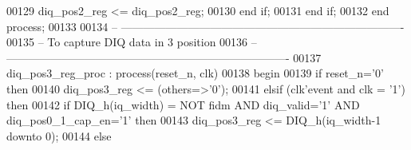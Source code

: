 \begin{DoxyCode}
00129                 \textcolor{vhdlchar}{diq_pos2_reg} \textcolor{vhdlchar}{<=} \textcolor{vhdlchar}{diq_pos2_reg};
00130             \textcolor{keywordflow}{end} \textcolor{keywordflow}{if}; 
00131         \textcolor{keywordflow}{end} \textcolor{keywordflow}{if};
00132     \textcolor{keywordflow}{end} \textcolor{keywordflow}{process};
00133 
00134 \textcolor{keyword}{-- ----------------------------------------------------------------------------}
00135 \textcolor{keyword}{-- To capture DIQ data in 3 position}
00136 \textcolor{keyword}{-- ----------------------------------------------------------------------------}
00137 diq\_pos3\_reg\_proc : \textcolor{keywordflow}{process}(reset_n, clk)
00138 \textcolor{vhdlkeyword}{    begin}
00139       \textcolor{keywordflow}{if} \textcolor{vhdlchar}{reset_n}\textcolor{vhdlchar}{=}\textcolor{vhdlchar}{'}\textcolor{vhdllogic}{}\textcolor{vhdllogic}{0}\textcolor{vhdlchar}{'} \textcolor{keywordflow}{then}
00140          \textcolor{vhdlchar}{diq_pos3_reg} \textcolor{vhdlchar}{<=} \textcolor{vhdlchar}{(}\textcolor{keywordflow}{others}\textcolor{vhdlchar}{=}\textcolor{vhdlchar}{>}\textcolor{vhdlchar}{'}\textcolor{vhdllogic}{}\textcolor{vhdllogic}{0}\textcolor{vhdlchar}{'}\textcolor{vhdlchar}{)}; 
00141       \textcolor{keywordflow}{elsif} \textcolor{vhdlchar}{(}\textcolor{vhdlchar}{clk}\textcolor{vhdlchar}{'}\textcolor{vhdlkeyword}{event} \textcolor{keywordflow}{and} \textcolor{vhdlchar}{clk} \textcolor{vhdlchar}{=} \textcolor{vhdlchar}{'}\textcolor{vhdllogic}{}\textcolor{vhdllogic}{1}\textcolor{vhdlchar}{'}\textcolor{vhdlchar}{)} \textcolor{keywordflow}{then}
00142             \textcolor{keywordflow}{if} \textcolor{vhdlchar}{DIQ_h}\textcolor{vhdlchar}{(}\textcolor{vhdlchar}{iq_width}\textcolor{vhdlchar}{)} \textcolor{vhdlchar}{=} \textcolor{keywordflow}{NOT} \textcolor{vhdlchar}{fidm} \textcolor{keywordflow}{AND} \textcolor{vhdlchar}{diq_valid}\textcolor{vhdlchar}{=}\textcolor{vhdlchar}{'}\textcolor{vhdllogic}{}\textcolor{vhdllogic}{1}\textcolor{vhdlchar}{'} \textcolor{keywordflow}{AND} \textcolor{vhdlchar}{
      diq_pos0_1_cap_en}\textcolor{vhdlchar}{=}\textcolor{vhdlchar}{'}\textcolor{vhdllogic}{}\textcolor{vhdllogic}{1}\textcolor{vhdlchar}{'} \textcolor{keywordflow}{then} 
00143             \textcolor{vhdlchar}{diq_pos3_reg} \textcolor{vhdlchar}{<=} \textcolor{vhdlchar}{DIQ_h}\textcolor{vhdlchar}{(}\textcolor{vhdlchar}{iq_width}\textcolor{vhdlchar}{-}\textcolor{vhdllogic}{}\textcolor{vhdllogic}{1} \textcolor{keywordflow}{downto} \textcolor{vhdllogic}{}\textcolor{vhdllogic}{0}\textcolor{vhdlchar}{)};
00144             \textcolor{keywordflow}{else} 

\end{DoxyCode}
